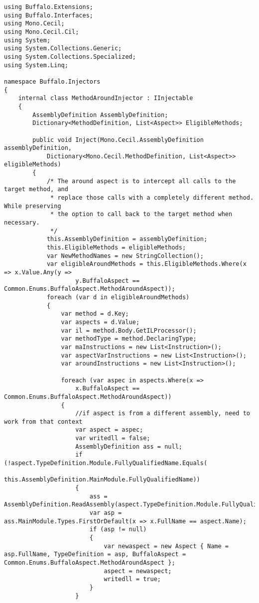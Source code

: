 \begin{lstlisting}[caption={../buffalo/Injectors/MethodAroundInjector.cs}, label=../buffalo/Injectors/MethodAroundInjector.cs, frame=tb, basicstyle=\scriptsize]﻿using Buffalo.Extensions;
using Buffalo.Interfaces;
using Mono.Cecil;
using Mono.Cecil.Cil;
using System;
using System.Collections.Generic;
using System.Collections.Specialized;
using System.Linq;

namespace Buffalo.Injectors
{
    internal class MethodAroundInjector : IInjectable
    {
        AssemblyDefinition AssemblyDefinition;
        Dictionary<MethodDefinition, List<Aspect>> EligibleMethods;

        public void Inject(Mono.Cecil.AssemblyDefinition assemblyDefinition, 
            Dictionary<Mono.Cecil.MethodDefinition, List<Aspect>> eligibleMethods)
        {
            /* The around aspect is to intercept all calls to the target method, and
             * replace those calls with a completely different method. While preserving
             * the option to call back to the target method when necessary.
             */
            this.AssemblyDefinition = assemblyDefinition;
            this.EligibleMethods = eligibleMethods;
            var NewMethodNames = new StringCollection();
            var eligibleAroundMethods = this.EligibleMethods.Where(x => x.Value.Any(y => 
                    y.BuffaloAspect == Common.Enums.BuffaloAspect.MethodAroundAspect));
            foreach (var d in eligibleAroundMethods)
            {
                var method = d.Key;
                var aspects = d.Value;
                var il = method.Body.GetILProcessor();
                var methodType = method.DeclaringType;
                var maInstructions = new List<Instruction>();
                var aspectVarInstructions = new List<Instruction>();
                var aroundInstructions = new List<Instruction>();

                foreach (var aspec in aspects.Where(x => 
                    x.BuffaloAspect == Common.Enums.BuffaloAspect.MethodAroundAspect))
                {
                    //if aspect is from a different assembly, need to work from that context
                    var aspect = aspec;
                    var writedll = false;
                    AssemblyDefinition ass = null;
                    if (!aspect.TypeDefinition.Module.FullyQualifiedName.Equals(
                        this.AssemblyDefinition.MainModule.FullyQualifiedName))
                    {
                        ass = AssemblyDefinition.ReadAssembly(aspect.TypeDefinition.Module.FullyQualifiedName);
                        var asp = ass.MainModule.Types.FirstOrDefault(x => x.FullName == aspect.Name);
                        if (asp != null)
                        {
                            var newaspect = new Aspect { Name = asp.FullName, TypeDefinition = asp, BuffaloAspect = Common.Enums.BuffaloAspect.MethodAroundAspect };
                            aspect = newaspect;
                            writedll = true;
                        }
                    }


\end{lstlisting}
